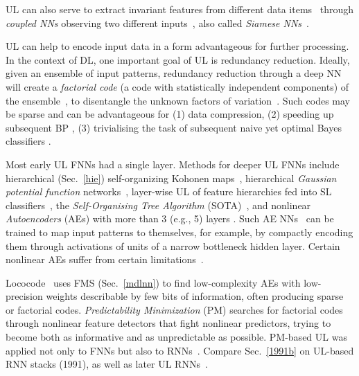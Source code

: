 \documentclass[letterpaper]{article}
\begin{document}
\begin{sloppypar}
UL can also serve to extract invariant features from different 
data items~\citep[e.g.,][]{Becker:91}
through {\em coupled NNs} observing two different inputs~\citep{siamese92and93},
also called {\em Siamese NNs}~\citep[e.g.,][]{bromley-93,hadsell-chopra-lecun-06,taylor2011,chen2011ieeetnn}.  

UL can help to encode
 input data in a form  advantageous for further processing. 
In the context of DL, 
one important goal of UL is redundancy reduction.
Ideally, given an ensemble of input  patterns, redundancy reduction
through a deep NN 
will create a {\em factorial code}
(a code with statistically independent components) 
of the ensemble~\citep{Barlow:89,Barlow:89review},
to disentangle the unknown factors of variation~\citep[compare][]{bengio2013tpami}.
Such codes may be sparse
and can be advantageous for 
(1) data compression, 
(2) speeding up subsequent BP \citep{Becker:91},
(3) trivialising  the task of subsequent naive yet optimal Bayes classifiers  
\citep{Schmidhuber:96ncedges}.



Most early UL FNNs had a single layer. 
Methods for deeper UL FNNs include 
hierarchical (Sec.~\ref{hie}) 
self-organizing Kohonen maps~\citep[e.g.,][]{koikkalainen1990,lampinen1992,versino1996,dittenbach2000,rauber2002},
hierarchical {\em Gaussian potential function} networks~\citep{lee1991},
layer-wise UL of feature hierarchies fed into SL 
classifiers~\citep{Behnke:IJCNN1999,Behnke:IJCNN2003}, 
the {\em Self-Organising Tree Algorithm} (SOTA)~\citep{herrero2001},
and nonlinear {\em Autoencoders} (AEs) 
with more than 3 (e.g., 5) layers
\citep{Kramer:91,Oja:91,DeMers:93}.
Such AE NNs~\citep{Rumelhart:86} can be trained to map input patterns to themselves,
for example, by  
compactly encoding them through activations of units of a narrow bottleneck hidden layer.
Certain nonlinear AEs suffer from certain limitations~\citep{baldijmlr12}.



{\sc Lococode}~\citep{Hochreiter:99nc} uses 
FMS (Sec.~\ref{mdlnn}) to
find low-complexity AEs with low-precision weights describable by 
few bits of information, often producing sparse or factorial codes.
{\em Predictability Minimization} (PM)
\citep{Schmidhuber:92ncfactorial} searches for factorial codes 
through nonlinear feature detectors that fight nonlinear predictors,
trying to become both as informative and as unpredictable as possible. 
PM-based UL was applied not only to FNNs but also to RNNs~\citep[e.g.,][]{schmidhuber1993,Steffi:93cmss}. 
Compare Sec.~\ref{1991b} on UL-based RNN stacks (1991),
as well as later UL RNNs~\citep[e.g.,][]{Klapper:01,steil2007}.


\end{sloppypar}
\end{document}
